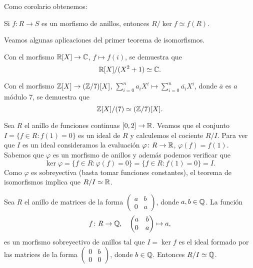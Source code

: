 Como corolario obtenemos:

\begin{corollary}
Si $f\colon R\to S$ es un morfismo de anillos, entonces $R/\ker f\simeq f(R)$. 
\end{corollary}


Veamos algunas aplicaciones del primer teorema de isomorfismos. 


\begin{example}
Con el morfismo $\mathbb{R}[X]\to\mathbb{C}$, $f\mapsto f(i)$, se demuestra que 
\[
\mathbb{R}[X]/(X^2+1)\simeq\mathbb{C}.
\]  	
\end{example}

\begin{example}
Con el morfismo $\mathbb{Z}[X]\to(\mathbb{Z}/7)[X]$, $\sum_{i=0}^na_iX^i\mapsto \sum_{i=0}^n\overline{a_i}X^i$, donde $\overline{a}$ es $a$ módulo 7, se demuestra que
\[
\mathbb{Z}[X]/(7)\simeq (\mathbb{Z}/7)[X].
\]	
\end{example}

\begin{example}
Sea $R$ el anillo de funciones continuas $[0,2]\to\mathbb{R}$. Veamos que el conjunto $I=\{f\in R:f(1)=0\}$ es un ideal de $R$ y calculemos
el cociente $R/I$. Para ver que $I$ es un ideal
consideramos la evaluación $\varphi\colon R\to\mathbb{R}$, $\varphi(f)=f(1)$. Sabemos que $\varphi$ es un morfismo de anillos y además 
podemos verificar que
\[
\ker\varphi=\{f\in R:\varphi(f)=0\}=\{f\in R:f(1)=0\}=I.
\]
Como $\varphi$ es sobreyectiva (basta tomar funciones constantes), el teorema de isomorfismos implica que $R/I\simeq\mathbb{R}$.  	
\end{example}

\begin{example}
Sea $R$ el anillo de matrices de la forma $\begin{pmatrix}a&b\\0&a\end{pmatrix}$, donde $a,b\in\mathbb{Q}$. La función 
\[
f\colon R\to\mathbb{Q},
\quad
\begin{pmatrix}a&b\\0&a\end{pmatrix}\mapsto a,
\]
es un morfismo sobreyectivo de anillos tal que $I=\ker f$ es el ideal formado por las matrices de la forma
$\begin{pmatrix}0&b\\0&0\end{pmatrix}$, donde $b\in\mathbb{Q}$. Entonces $R/I\simeq\mathbb{Q}$.  
\end{example}

